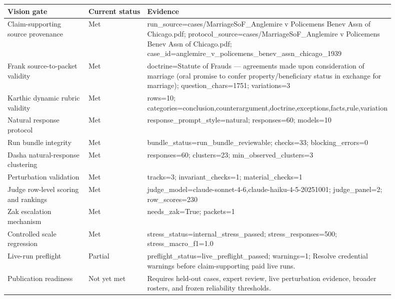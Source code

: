 \begin{tabular}{p{0.25\linewidth}p{0.18\linewidth}p{0.47\linewidth}}
\toprule
Vision gate & Current status & Evidence \\
\midrule
Claim-supporting source provenance & Met & run\_source=cases/MarriageSoF\_Anglemire v Policemens Benev Assn of Chicago.pdf; protocol\_source=cases/MarriageSoF\_Anglemire v Policemens Benev Assn of Chicago.pdf; case\_id=anglemire\_v\_policemens\_benev\_assn\_chicago\_1939 \\
Frank source-to-packet validity & Met & doctrine=Statute of Frauds — agreements made upon consideration of marriage (oral promise to confer property/beneficiary status in exchange for marriage); question\_chars=1751; variations=3 \\
Karthic dynamic rubric validity & Met & rows=10; categories=conclusion,counterargument,doctrine,exceptions,facts,rule,variation \\
Natural response protocol & Met & response\_prompt\_style=natural; responses=60; models=10 \\
Run bundle integrity & Met & bundle\_status=run\_bundle\_reviewable; checks=33; blocking\_errors=0 \\
Dasha natural-response clustering & Met & responses=60; clusters=23; min\_observed\_clusters=3 \\
Perturbation validation & Met & tracks=3; invariant\_checks=1; material\_checks=1 \\
Judge row-level scoring and rankings & Met & judge\_model=claude-sonnet-4-6,claude-haiku-4-5-20251001; judge\_panel=2; row\_scores=230 \\
Zak escalation mechanism & Met & needs\_zak=True; packets=1 \\
Controlled scale regression & Met & stress\_status=internal\_stress\_passed; stress\_responses=500; stress\_macro\_f1=1.0 \\
Live-run preflight & Partial & preflight\_status=live\_preflight\_passed; warnings=1; Resolve credential warnings before claim-supporting paid live runs. \\
Publication readiness & Not yet met & Requires held-out cases, expert review, live perturbation evidence, broader rosters, and frozen reliability thresholds. \\
\bottomrule
\end{tabular}
